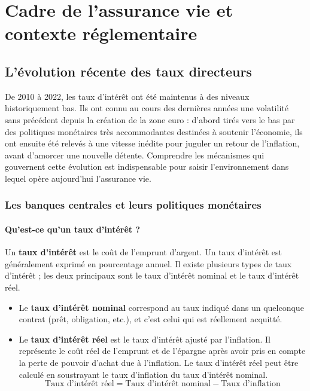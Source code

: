 \chapter{Cadre de l'assurance vie et contexte réglementaire}
\label{chap:cadre_assurance_vie_et_contexte_reglementaire}




\section{L'évolution récente des taux directeurs}

De 2010 à 2022, les taux d'intérêt ont été maintenus à des niveaux historiquement bas. Ils ont connu au cours des dernières années une volatilité sans précédent depuis la création de la zone euro : d'abord tirés vers le bas par des politiques monétaires très accommodantes destinées à soutenir l'économie, ils ont ensuite été relevés à une vitesse inédite pour juguler un retour de l'inflation, avant d'amorcer une nouvelle détente. Comprendre les mécanismes qui gouvernent cette évolution est indispensable pour saisir l'environnement dans lequel opère aujourd'hui l'assurance vie.

\subsection{Les banques centrales et leurs politiques monétaires}
\subsubsection{Qu'est-ce qu'un taux d'intérêt ?}
Un \textbf{taux d'intérêt} est le coût de l'emprunt d'argent. Un taux d'intérêt est généralement exprimé en pourcentage annuel. Il existe plusieurs types de taux d'intérêt ; les deux principaux sont le taux d'intérêt nominal et le taux d'intérêt réel. \cite{banque_de_france1}

\begin{itemize}
    \item Le \textbf{taux d'intérêt nominal} correspond au taux indiqué dans un quelconque contrat (prêt, obligation, etc.), et c'est celui qui est réellement acquitté.
    \item Le \textbf{taux d'intérêt réel} est le taux d'intérêt ajusté par l'inflation. Il représente le coût réel de l'emprunt et de l'épargne après avoir pris en compte la perte de pouvoir d'achat due à l'inflation. Le taux d'intérêt réel peut être calculé en soustrayant le taux d'inflation du taux d'intérêt nominal.
    \begin{equation}
        \text{Taux d'intérêt réel} = \text{Taux d'intérêt nominal} - \text{Taux d'inflation}
    \end{equation}
\end{itemize}

